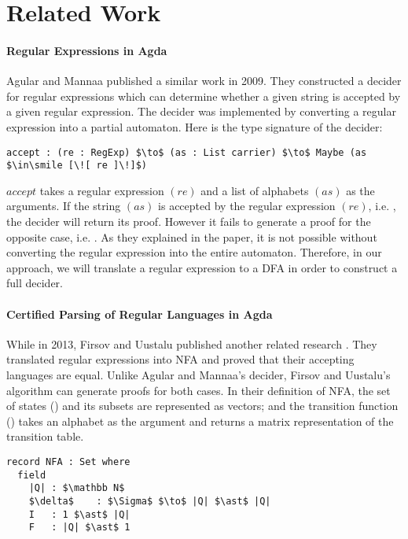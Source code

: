 \section{Related Work}
\paragraph{Regular Expressions in Agda} Agular and Mannaa published a
similar work \cite{agular2009} in 2009. They constructed a decider for
regular expressions which can determine whether
a given string is accepted by a given regular expression. The decider
was implemented by converting a regular expression into a
partial automaton. Here is the type signature of the decider: 
\begin{lstlisting}[mathescape=true,xleftmargin=.3\textwidth]
accept : (re : RegExp) $\to$ (as : List carrier) $\to$ Maybe (as $\in\smile [\![ re ]\!]$)
\end{lstlisting}
\par \(accept\) takes a regular expression \((re)\) and a list of
alphabets \((as)\) as the arguments. If the string \((as)\) is accepted
by the regular expression \((re)\), i.e. , the decider will return its proof. However it fails to generate a
proof for the opposite case, i.e. . As they
explained in the paper, it is not possible without converting the regular expression into
the entire automaton. Therefore, in our approach, we will translate a regular
expression to a DFA in order to construct a full decider. 


\paragraph{Certified Parsing of Regular Languages in Agda} While in 2013, Firsov and Uustalu published another related
research \cite{firsov2013}. They translated regular expressions
into NFA and proved that their accepting languages are
equal. Unlike Agular and Mannaa's decider, Firsov and Uustalu's
algorithm can generate proofs for both cases. In their definition of NFA, the set of states
() and its subsets are represented as vectors; and the transition function
(\mb{\delta}) takes an alphabet as the argument and returns a matrix
representation of the transition table. 
\begin{lstlisting}[mathescape=true,xleftmargin=.3\textwidth]
record NFA : Set where
  field
    |Q| : $\mathbb N$
    $\delta$    : $\Sigma$ $\to$ |Q| $\ast$ |Q|
    I   : 1 $\ast$ |Q|
    F   : |Q| $\ast$ 1
\end{lstlisting}

